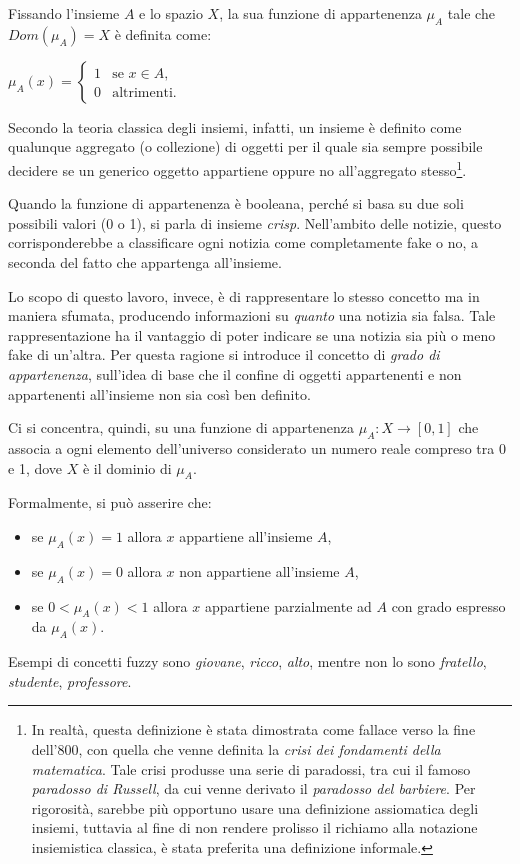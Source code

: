 \documentclass[12pt]{report}
\theoremstyle{definition}
\begin{document}
Fissando l'insieme $A$ e lo spazio $X$, la sua funzione di appartenenza $\mu_A$ tale che $Dom(\mu_A) = X$ è definita come:
\begin{center}
    $\mu_A(x)= \begin{cases} 1 & \mbox{se } x \in A, \\ 0 & \mbox{altrimenti.} \end{cases}$
\end{center}
Secondo la teoria classica degli insiemi, infatti, un insieme è definito come qualunque aggregato (o collezione) di oggetti per il quale sia sempre possibile decidere se un generico oggetto appartiene oppure no all'aggregato stesso\footnote{In realtà, questa definizione è stata dimostrata come fallace verso la fine dell'800, con quella che venne definita la \textit{crisi dei fondamenti della matematica}. Tale crisi produsse una serie di paradossi, tra cui il famoso \textit{paradosso di Russell}, da cui venne derivato il \textit{paradosso del barbiere}. Per rigorosità, sarebbe più opportuno usare una definizione assiomatica degli insiemi, tuttavia al fine di non rendere prolisso il richiamo alla notazione insiemistica classica, è stata preferita una definizione informale.}.

Quando la funzione di appartenenza è booleana, perché si basa su due soli possibili valori (0 o 1), si parla di insieme \textit{crisp}. Nell'ambito delle notizie, questo corrisponderebbe a classificare ogni notizia come completamente fake o no, a seconda del fatto che appartenga all'insieme.

Lo scopo di questo lavoro, invece, è di rappresentare lo stesso concetto ma in maniera sfumata, producendo informazioni su \textit{quanto} una notizia sia falsa.
Tale rappresentazione ha il vantaggio di poter indicare se una notizia sia più o meno fake di un'altra.
Per questa ragione si introduce il concetto di \textit{grado di appartenenza}, sull'idea di base che il confine di oggetti appartenenti e non appartenenti all'insieme non sia così ben definito.

Ci si concentra, quindi, su una funzione di appartenenza $\mu_A: X \rightarrow [0,1]$ che associa a ogni elemento dell'universo considerato un numero reale compreso tra 0 e 1, dove $X$ è il dominio di $\mu_A$.

Formalmente, si può asserire che:
\begin{itemize}
    \item se $\mu_A(x) = 1$ allora $x$ appartiene all'insieme $A$,
    \item se $\mu_A(x) = 0$ allora $x$ non appartiene all'insieme $A$,
    \item se $0 < \mu_A(x) < 1$ allora $x$ appartiene parzialmente ad $A$ con grado espresso da $\mu_A(x)$.
\end{itemize}
Esempi di concetti fuzzy sono \textit{giovane}, \textit{ricco}, \textit{alto}, mentre non lo sono \textit{fratello}, \textit{studente}, \textit{professore}.
\end{document}
